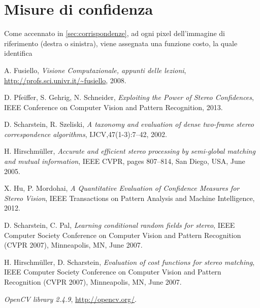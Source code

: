 \documentclass[12pt]{report}
\begin{document}
			



	\chapter{Misure di confidenza}
	\label{sec:confidenza}
	\pagestyle{fancy}
	
		Come accennato in \ref{sec:corrispondenze}, ad ogni pixel dell'immagine di riferimento (destra o sinistra), viene assegnata una funzione costo, la quale identifica 
			
			
			
			
			
		
				
	\begin{thebibliography}{1}
		
		A. Fusiello,
		\emph{Visione Computazionale, appunti delle lezioni},
		\url{http://profs.sci.univr.it/~fusiello},
		2008.

		D. Pfeiffer, S. Gehrig, N. Schneider,
		\emph{Exploiting the Power of Stereo Confidences},
		IEEE Conference on Computer Vision and Pattern Recognition, 2013.
	
		D. Scharstein, R. Szeliski, 
		\emph{A taxonomy and evaluation of
		dense two-frame stereo correspondence algorithms}, 
		IJCV,47(1-3):7–42, 2002.
		
		H. Hirschmüller, 
		\emph{Accurate and efficient stereo processing
		by semi-global matching and mutual information}, 
		IEEE CVPR, pages 807–814, San Diego, USA, June 2005.
		
		X. Hu, P. Mordohai,
		\emph{A Quantitative Evaluation of Confidence Measures for Stereo Vision},
		IEEE Transactions on Pattern Analysis and Machine Intelligence, 2012.
		
		D. Scharstein, C. Pal,
		\emph{Learning conditional random fields for stereo},
		IEEE Computer Society Conference on Computer Vision and Pattern Recognition (CVPR 2007), Minneapolis, MN, June 2007.
		
		H. Hirschmüller, D. Scharstein,
		\emph{Evaluation of cost functions for stereo matching},
		IEEE Computer Society Conference on Computer Vision and Pattern Recognition (CVPR 2007), Minneapolis, MN, June 2007.
		
		\emph{OpenCV library 2.4.9},
		\url{http://opencv.org/}.
		
		
		
	\end{thebibliography}	
	
\end{document}
